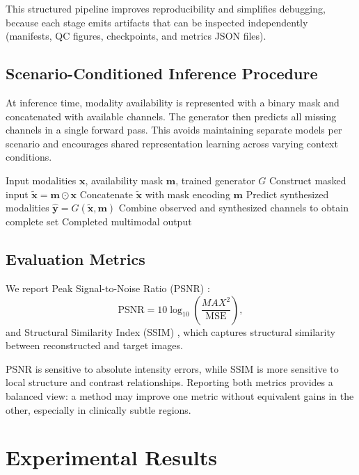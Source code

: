 \documentclass[conference]{IEEEtran}
\begin{document}
This structured pipeline improves reproducibility and simplifies debugging, because each stage emits artifacts that can be inspected independently (manifests, QC figures, checkpoints, and metrics JSON files).

\subsection{Scenario-Conditioned Inference Procedure}
At inference time, modality availability is represented with a binary mask and concatenated with available channels. The generator then predicts all missing channels in a single forward pass. This avoids maintaining separate models per scenario and encourages shared representation learning across varying context conditions.

\begin{algorithm}[H]
\caption{Scenario-Conditioned Multimodal Imputation}
\label{alg:imputation}
\begin{algorithmic}[1]
\REQUIRE Input modalities $\mathbf{x}$, availability mask $\mathbf{m}$, trained generator $G$
\STATE Construct masked input $\tilde{\mathbf{x}} = \mathbf{m} \odot \mathbf{x}$
\STATE Concatenate $\tilde{\mathbf{x}}$ with mask encoding $\mathbf{m}$
\STATE Predict synthesized modalities $\hat{\mathbf{y}} = G(\tilde{\mathbf{x}}, \mathbf{m})$
\STATE Combine observed and synthesized channels to obtain complete set
\RETURN Completed multimodal output
\end{algorithmic}
\end{algorithm}

\subsection{Evaluation Metrics}
We report Peak Signal-to-Noise Ratio (PSNR) \cite{psnr}:
\begin{equation}
\mathrm{PSNR} = 10\log_{10}\left(\frac{MAX^2}{\mathrm{MSE}}\right),
\end{equation}
and Structural Similarity Index (SSIM) \cite{ssim}, which captures structural similarity between reconstructed and target images.

PSNR is sensitive to absolute intensity errors, while SSIM is more sensitive to local structure and contrast relationships. Reporting both metrics provides a balanced view: a method may improve one metric without equivalent gains in the other, especially in clinically subtle regions.

\section{Experimental Results}
\end{document}
